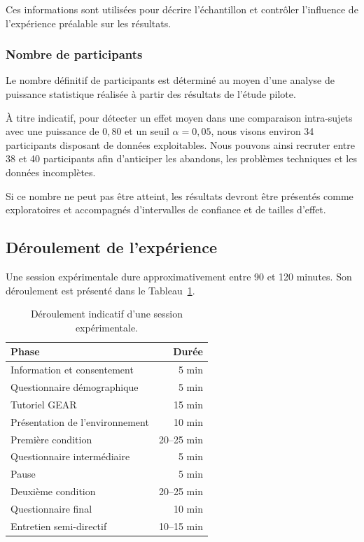 Ces informations sont utilisées pour décrire l'échantillon et contrôler
l'influence de l'expérience préalable sur les résultats.


\subsubsection{Nombre de participants}

Le nombre définitif de participants est déterminé au moyen d'une
analyse de puissance statistique réalisée à partir des résultats de
l'étude pilote.

À titre indicatif, pour détecter un effet moyen dans une comparaison
intra-sujets avec une puissance de $0{,}80$ et un seuil
$\alpha=0{,}05$, nous visons environ 34 participants disposant de
données exploitables. Nous pouvons ainsi recruter entre 38 et 40
participants afin d'anticiper les abandons, les problèmes techniques et
les données incomplètes.

Si ce nombre ne peut pas être atteint, les résultats devront être
présentés comme exploratoires et accompagnés d'intervalles de confiance
et de tailles d'effet.


\subsection{Déroulement de l'expérience}
\label{subsec:deroulement-experience}

Une session expérimentale dure approximativement entre 90 et
120 minutes. Son déroulement est présenté dans le
Tableau~\ref{tab:deroulement-session}.

\begin{table}[t]
    \centering
    \caption{Déroulement indicatif d'une session expérimentale.}
    \label{tab:deroulement-session}
    \begin{tabular}{@{}lr@{}}
        \toprule
        \textbf{Phase} & \textbf{Durée} \\
        \midrule
        Information et consentement
            & 5 min \\
        Questionnaire démographique
            & 5 min \\
        Tutoriel GEAR
            & 15 min \\
        Présentation de l'environnement
            & 10 min \\
        Première condition
            & 20--25 min \\
        Questionnaire intermédiaire
            & 5 min \\
        Pause
            & 5 min \\
        Deuxième condition
            & 20--25 min \\
        Questionnaire final
            & 10 min \\
        Entretien semi-directif
            & 10--15 min \\
        \bottomrule
    \end{tabular}
\end{table}


